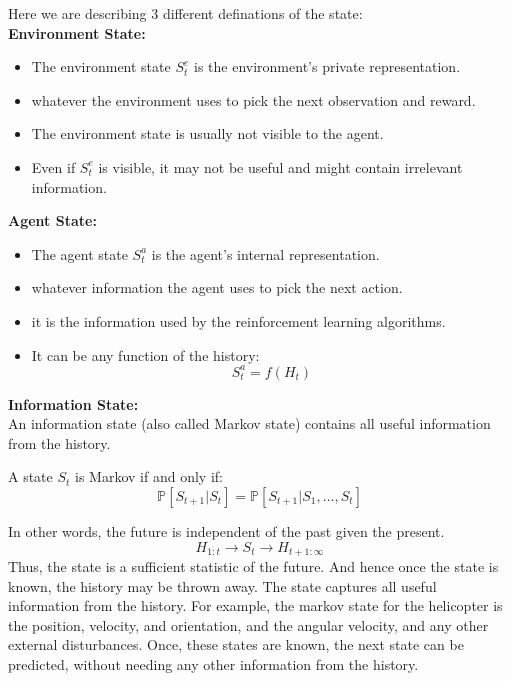 Here we are describing 3 different definations of the state:\\
\textbf{Environment State: }
\begin{itemize}
    \item The environment state \(S_t^e\) is the environment's private representation.
    \item whatever the environment uses to pick the next observation and reward. 
    \item The environment state is usually not visible to the agent.
    \item Even if \(S_t^e\) is visible, it may not be useful and might contain irrelevant information.
\end{itemize}
\textbf{Agent State:}
\begin{itemize}
    \item The agent state \(S_t^a\) is the agent's internal representation.
    \item whatever information the agent uses to pick the next action.
    \item it is the information used by the reinforcement learning algorithms.
    \item It can be any function of the history:
    \[
        S_t^a = f(H_t)  
    \]
\end{itemize}
\textbf{Information State:}\\
An information state (also called Markov state) contains all useful information from the history.
\begin{definition}
    A state \(S_t\) is Markov if and only if:
    \[
        \mathbb{P} [S_{t+1} | S_t] = \mathbb{P} [S_{t+1} | S_1, \dots, S_t]  
    \]
\end{definition}
In other words, the future is independent of the past given the present.
\[
    H_{1:t} \to S_t \to H_{t+1:\infty}
\]
Thus, the state is a sufficient statistic of the future. And hence once the state is known, the history
may be thrown away. The state captures all useful information from the history.
For example, the markov state for the helicopter is the position, velocity, and orientation, and the
angular velocity, and any other external disturbances. Once, these states are known, the next 
state can be predicted, without needing any other information from the history.

